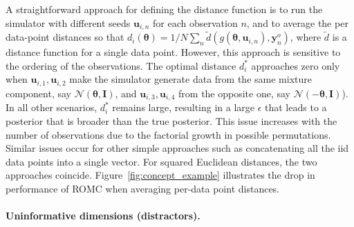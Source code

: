 \documentclass[twoside]{article}
\newcommand{\thb}{\boldsymbol{\theta}}
\newcommand{\ub}{\mathbf{u}}
\newcommand{\data}{\mathbf{y}^o}
\begin{document}
A straightforward approach for defining the distance function is to run the simulator with different seeds $\ub_{i,n}$ for each observation $n$, and to average the per data-point distances so that $d_i(\thb) = 1/N \sum_n \tilde{d}(g(\thb, \ub_{i,n}), \data_n)$, where $\tilde{d}$ is a distance function for a single data point. However, this approach is sensitive to the ordering of the observations. The optimal distance $d_i^*$ approaches zero only when $\ub_{i,1}, \ub_{i,2}$ make the simulator generate data from the same mixture component, say $\mathcal{N}(\thb, \mathbf{I})$, and $\ub_{i,3}, \ub_{i,4}$ from the opposite one, say $\mathcal{N}(-\thb, \mathbf{I})$).
In all other scenarios, $d_i^*$ remains large, resulting in a large $\epsilon$ that leads to a posterior that is broader than the true posterior. This issue increases with the number of observations due to the factorial growth in possible permutations. Similar issues occur for other simple approaches such as concatenating all the iid data points  into a single vector. For squared Euclidean distances, the two approaches coincide.
Figure~\ref{fig:concept_example} illustrates the drop in performance of ROMC when averaging per-data point distances. %

\paragraph{Uninformative dimensions (distractors).}
\label{sec:romc-limitation-1}
\end{document}
